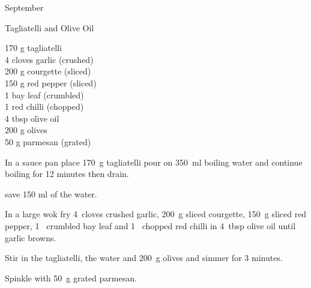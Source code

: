 \begin{menu}{September}
    \begin{recipe}{1}{Tagliatelli and Olive Oil}%
		\begin{ingredients}
		170 g tagliatelli  \\
	4 cloves garlic (crushed) \\
	200 g courgette (sliced) \\
	150 g red pepper (sliced) \\
	1  bay leaf (crumbled) \\
	1  red chilli (chopped) \\
	4 tbsp olive oil  \\
	200 g olives  \\
	50 g parmesan (grated) \\
	
		\end{ingredients}
	
	
    \begin{instructions}
    \item 
    In a
    sauce pan
    place
    170~g  tagliatelli
    pour on
    350~ml  boiling water
    and continue boiling for 12 minutes then drain.
  
        save 150 ml of the water.
      \item 
        In a large wok fry
        4~cloves crushed garlic,
        200~g sliced courgette,
        150~g sliced red pepper,
        1~ crumbled bay leaf
        and
        1~ chopped red chilli
        in
        4~tbsp  olive oil
        until garlic browns.
      \item 
        Stir in the tagliatelli,
        the water
        and
        200~g  olives
        and simmer for 3 minutes.
      \item 
        Spinkle with
        50~g grated parmesan.
      
    \end{instructions}
    \end{recipe}%
  
    \clearpage
    \end{menu}
	
